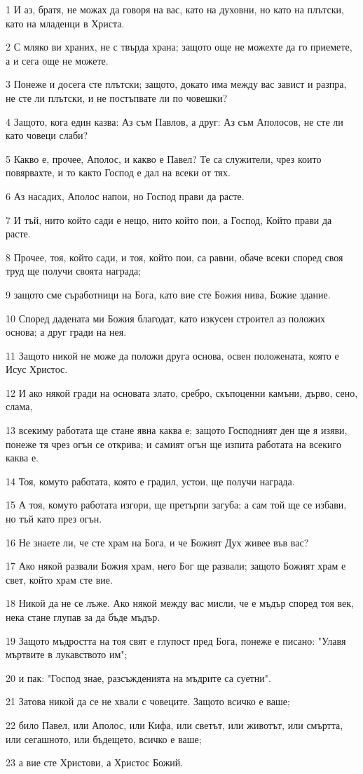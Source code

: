 \par 1 И аз, братя, не можах да говоря на вас, като на духовни, но като на плътски, като на младенци в Христа.
\par 2 С мляко ви храних, не с твърда храна; защото още не можехте да го приемете, а и сега още не можете.
\par 3 Понеже и досега сте плътски; защото, докато има между вас завист и разпра, не сте ли плътски, и не постъпвате ли по човешки?
\par 4 Защото, кога един казва: Аз съм Павлов, а друг: Аз съм Аполосов, не сте ли като човеци слаби?
\par 5 Какво е, прочее, Аполос, и какво е Павел? Те са служители, чрез които повярвахте, и то както Господ е дал на всеки от тях.
\par 6 Аз насадих, Аполос напои, но Господ прави да расте.
\par 7 И тъй, нито който сади е нещо, нито който пои, а Господ, Който прави да расте.
\par 8 Прочее, тоя, който сади, и тоя, който пои, са равни, обаче всеки според своя труд ще получи своята награда;
\par 9 защото сме съработници на Бога, като вие сте Божия нива, Божие здание.
\par 10 Според дадената ми Божия благодат, като изкусен строител аз положих основа; а друг гради на нея.
\par 11 Защото никой не може да положи друга основа, освен положената, която е Исус Христос.
\par 12 И ако някой гради на основата злато, сребро, скъпоценни камъни, дърво, сено, слама,
\par 13 всекиму работата ще стане явна каква е; защото Господният ден ще я изяви, понеже тя чрез огън се открива; и самият огън ще изпита работата на всекиго каква е.
\par 14 Тоя, комуто работата, която е градил, устои, ще получи награда.
\par 15 А тоя, комуто работата изгори, ще претърпи загуба; а сам той ще се избави, но тъй като през огън.
\par 16 Не знаете ли, че сте храм на Бога, и че Божият Дух живее във вас?
\par 17 Ако някой развали Божия храм, него Бог ще развали; защото Божият храм е свет, който храм сте вие.
\par 18 Никой да не се лъже. Ако някой между вас мисли, че е мъдър според тоя век, нека стане глупав за да бъде мъдър.
\par 19 Защото мъдростта на тоя свят е глупост пред Бога, понеже е писано: "Улавя мъртвите в лукавството им";
\par 20 и пак: "Господ знае, разсъжденията на мъдрите са суетни".
\par 21 Затова никой да се не хвали с човеците. Защото всичко е ваше;
\par 22 било Павел, или Аполос, или Кифа, или светът, или животът, или смъртта, или сегашното, или бъдещето, всичко е ваше;
\par 23 а вие сте Христови, а Христос Божий.

